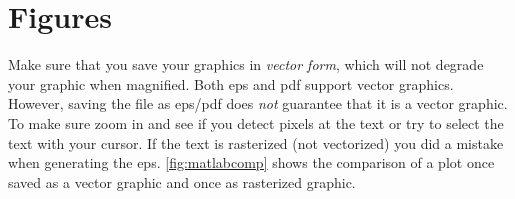 \section{Figures}
\label{sec:figures}                                     

Make sure that you save your graphics in \textit{vector form}, which will not degrade your graphic when magnified. Both eps and pdf support vector graphics. However, saving the file as eps/pdf does \textit{not} guarantee that it is a vector graphic. To make sure zoom in and see if you detect pixels at the text or try to select the text with your cursor. If the text is rasterized (not vectorized) you did a mistake when generating the eps. \autoref{fig:matlabcomp} shows the comparison of a plot once saved as a vector graphic and once as rasterized graphic. 

